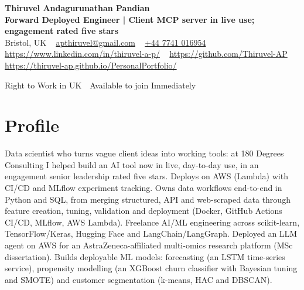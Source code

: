 \documentclass[a4paper,11pt]{article}
\begin{document}
\begin{center}
  {\LARGE\bfseries Thiruvel Andagurunathan Pandian} \\[3pt]
  {\color{headernavy}\small\textbf{Forward Deployed Engineer | Client MCP server in live use; engagement rated five stars}} \\[3pt]
  {\small
  Bristol, UK\nobreak\ \,\textbar\, \href{mailto:apthiruvel@gmail.com}{apthiruvel@gmail.com}\nobreak\ \,\textbar\, \href{tel:+447741016954}{+44 7741 016954}\nobreak\ \,\textbar\, \href{https://www.linkedin.com/in/thiruvel-a-p/}{https://www.linkedin.com/in/thiruvel-a-p/}\nobreak\ \,\textbar\, \href{https://github.com/Thiruvel-AP}{https://github.com/Thiruvel-AP}\nobreak\ \,\textbar\, \href{https://thiruvel-ap.github.io/PersonalPortfolio/}{https://thiruvel-ap.github.io/PersonalPortfolio/}}\par\vspace{4pt}
  \noindent{} Right to Work in UK \,\textbar\, Available to join Immediately
\end{center}

\section{Profile}
Data scientist who turns vague client ideas into working tools: at 180 Degrees Consulting I helped build an AI tool now in live, day-to-day use, in an engagement senior leadership rated five stars. Deploys on AWS (Lambda) with CI/CD and MLflow experiment tracking. Owns data workflows end-to-end in Python and SQL, from merging structured, API and web-scraped data through feature creation, tuning, validation and deployment (Docker, GitHub Actions CI/CD, MLflow, AWS Lambda). Freelance AI/ML engineering across scikit-learn, TensorFlow/Keras, Hugging Face and LangChain/LangGraph. Deployed an LLM agent on AWS for an AstraZeneca-affiliated multi-omics research platform (MSc dissertation). Builds deployable ML models: forecasting (an LSTM time-series service), propensity modelling (an XGBoost churn classifier with Bayesian tuning and SMOTE) and customer segmentation (k-means, HAC and DBSCAN).
\end{document}
